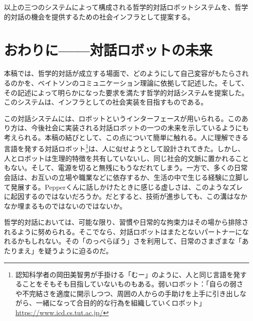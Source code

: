 \documentclass[b5j,twoside,twocolumn]{utarticle}
\begin{document}
以上の三つのシステムによって構成される哲学的対話ロボットシステムを、哲学的対話の機会を提供するための社会インフラとして提案する。



\section{おわりに------対話ロボットの未来}
本稿では、哲学的対話が成立する場面で、どのようにして自己変容がもたらされるのかを、ベイトソンのコミュニケーション理論に依拠して記述した。そして、その記述によって明らかになった要求を満たす哲学的対話システムを提案した。このシステムは、インフラとしての社会実装を目指すものである。


この対話システムには、ロボットというインターフェースが用いられる。このあり方は、今後社会に実装される対話ロボットの一つの未来を示しているようにも考えられる。本稿の結びとして、この点について簡単に触れる。人に理解できる言語を発する対話ロボット\footnote{認知科学者の岡田美智男が手掛ける「むー」のように、人と同じ言語を発することをそもそも目指していないものもある。弱いロボット：「自らの弱さや不完結さを適度に開示しつつ、周囲の人からの手助けを上手に引き出しながら、一緒になって合目的的な行為を組織していくロボット」\url{https://www.icd.cs.tut.ac.jp/}}は、人に似せようとして設計されてきた。しかし、人とロボットは生理的特徴を共有していないし、同じ社会的文脈に置かれることもない。そして、電源を切ると無残にもうなだれてしまう。一方で、多くの日常会話は、お互いの立場や職業などに依存するか、生活の中で生じる経験に立脚して発展する。Pepperくんに話しかけたときに感じる虚しさは、このようなズレに起因するのではないだろうか。だとすると、技術が進歩しても、この溝はなかなか埋まるものではないのではないか。


哲学的対話においては、可能な限り、習慣や日常的な拘束力はその場から排除されるように努められる。そこでなら、対話ロボットはまたとないパートナーになれるかもしれない。その「のっぺらぼう」さを利用して、日常のさまざまな「あたりまえ」を疑うように迫るのだ。\\
\end{document}
